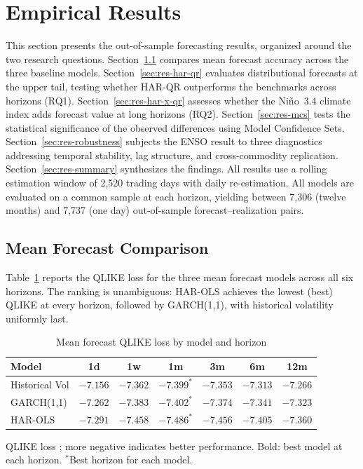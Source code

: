 \section{Empirical Results}
\label{sec:results}

This section presents the out-of-sample forecasting results, organized around
the two research questions. Section~\ref{sec:res-mean} compares mean forecast
accuracy across the three baseline models. Section~\ref{sec:res-har-qr}
evaluates distributional forecasts at the upper tail, testing whether HAR-QR
outperforms the benchmarks across horizons (RQ1). Section~\ref{sec:res-har-x-qr}
assesses whether the Ni\~no~3.4 climate index adds forecast value at long
horizons (RQ2). Section~\ref{sec:res-mcs} tests the statistical significance
of the observed differences using Model Confidence Sets.
Section~\ref{sec:res-robustness} subjects the ENSO result to three diagnostics
addressing temporal stability, lag structure, and cross-commodity replication.
Section~\ref{sec:res-summary} synthesizes the findings. All
results use a rolling estimation window of 2,520 trading days with daily
re-estimation. All models are evaluated on a common sample at each horizon,
yielding between 7,306 (twelve months) and 7,737 (one day) out-of-sample
forecast--realization pairs.

\subsection{Mean Forecast Comparison}
\label{sec:res-mean}

Table~\ref{tab:mean-qlike} reports the QLIKE loss for the three mean forecast
models across all six horizons. The ranking is unambiguous: HAR-OLS achieves the lowest
(best) QLIKE at every horizon, followed by GARCH(1,1), with historical
volatility uniformly last.

\begin{table}[htbp]
\centering
\small
\caption{Mean forecast QLIKE loss by model and horizon}
\label{tab:mean-qlike}
\begin{tabular}{lcccccc}
\toprule
Model & 1d & 1w & 1m & 3m & 6m & 12m \\
\midrule
Historical Vol    & $-7.156$ & $-7.362$ & $-7.399^{*}$ & $-7.353$ & $-7.313$ & $-7.266$ \\
GARCH(1,1)        & $-7.262$ & $-7.383$ & $-7.402^{*}$ & $-7.374$ & $-7.341$ & $-7.323$ \\
HAR-OLS           & $\mathbf{-7.291}$ & $\mathbf{-7.458}$ & $\mathbf{-7.486}^{*}$ & $\mathbf{-7.456}$ & $\mathbf{-7.405}$ & $\mathbf{-7.360}$ \\
\bottomrule
\end{tabular}
\par\smallskip
{\footnotesize QLIKE loss \parencite{pattonVolatilityForecastComparison}; more negative indicates better performance. Bold: best model at each horizon. $^{*}$Best horizon for each model.}
\end{table}

